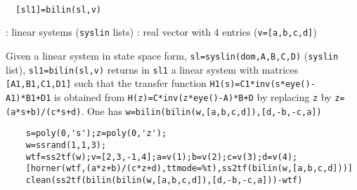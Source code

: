 \begin{mandesc}
   \\ %
\end{mandesc}
\begin{calling_sequence}
\begin{verbatim}
  [sl1]=bilin(sl,v)  
\end{verbatim}
\end{calling_sequence}
\begin{parameters}
  \begin{varlist}
    : linear systems (\verb!syslin! lists)
    : real vector with 4 entries (\verb!v=[a,b,c,d]!)
  \end{varlist}
\end{parameters}
\begin{mandescription}
  Given a linear system in state space form, \verb!sl=syslin(dom,A,B,C,D)! 
  (\verb!syslin! list), \verb!sl1=bilin(sl,v)!  returns in \verb!sl1! a 
  linear system with matrices \verb![A1,B1,C1,D1]! such that
  the transfer function \verb!H1(s)=C1*inv(s*eye()-A1)*B1+D1! is
  obtained from \verb!H(z)=C*inv(z*eye()-A)*B+D! by replacing \verb!z!
  by \verb!z=(a*s+b)/(c*s+d)!.
  One has \verb!w=bilin(bilin(w,[a,b,c,d]),[d,-b,-c,a])!
\end{mandescription}
\begin{examples}
  \begin{Verbatim}
    s=poly(0,'s');z=poly(0,'z');
    w=ssrand(1,1,3);
    wtf=ss2tf(w);v=[2,3,-1,4];a=v(1);b=v(2);c=v(3);d=v(4);
    [horner(wtf,(a*z+b)/(c*z+d),ttmode=%t),ss2tf(bilin(w,[a,b,c,d]))]
    clean(ss2tf(bilin(bilin(w,[a,b,c,d]),[d,-b,-c,a]))-wtf)
  \end{Verbatim}
\end{examples}
\begin{manseealso}
     
\end{manseealso}

